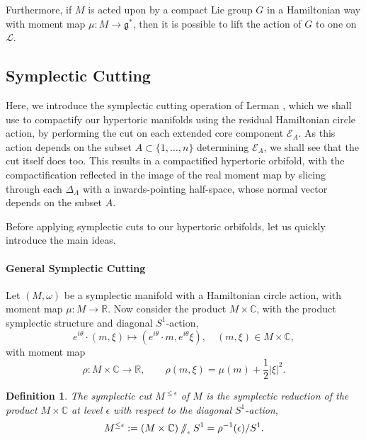 \documentclass{amsart}
\newtheorem{defn}[theorem]{Definition\rm}
\newcommand{\ra}{\rightarrow}
\newcommand{\w}{\omega}
\newcommand{\e}{\epsilon}
\newcommand{\RR}{\mathbb{R}}
\newcommand{\CC}{\mathbb{C}}
\newcommand{\mcE}{\mathcal{E}}
\newcommand{\mcL}{\mathcal{L}}
\newcommand{\mfg}{\mathfrak{g}}
\newcommand{\sslash}{\mathbin{/\mkern-6mu/}}
\begin{document}
	Furthermore, if $M$ is acted upon by a compact Lie group $G$ in a Hamiltonian way with moment map $\mu : M \ra \mfg^{\ast}$, then it is possible to lift the action of $G$ to one on $\mcL$. 

	\subsection{Symplectic Cutting}
	
	Here, we introduce the symplectic cutting operation of Lerman \cite{Ler95}, which we shall use to compactify our hypertoric manifolds using the residual Hamiltonian circle action, by performing the cut on each extended core component $\mcE_{A}$. As this action depends on the subset $A \subset \{1, \ldots, n\}$ determining $\mcE_{A}$, we shall see that the cut itself does too. This results in a compactified hypertoric orbifold, with the compactification reflected in the image of the real moment map by slicing through each $\Delta_{A}$ with a inwards-pointing half-space, whose normal vector depends on the subset $A$.
	
	Before applying symplectic cuts to our hypertoric orbifolds, let us quickly introduce the main ideas.
	
	\paragraph{General Symplectic Cutting}
	
	Let $(M,\w)$ be a symplectic manifold with a Hamiltonian circle action, with moment map $\mu : M \ra \RR$. Now consider the product $M \times \CC$, with the product symplectic structure and diagonal $S^{1}$-action,
	\[
		e^{i\theta} \cdot (m, \xi) \longmapsto (e^{i\theta} \cdot m, e^{i\theta}\xi), \quad (m,\xi) \in M \times \CC,
	\]
	with moment map
	\[
		\rho : M \times \CC \ra \RR, \qquad \rho(m,\xi) = \mu(m) + \frac{1}{2}|\xi|^{2}.
	\]
	
	\begin{defn}
		The \emph{symplectic cut} $M^{\leq\e}$ of $M$ is the symplectic reduction of the product $M \times \CC$ at level $\e$ with respect to the diagonal $S^{1}$-action,
		\[
			M^{\leq\e} := (M \times \CC) \sslash_{\e} S^{1} = \rho^{-1}(\e)/S^{1}.
		\]
	\end{defn}
	
\end{document}

